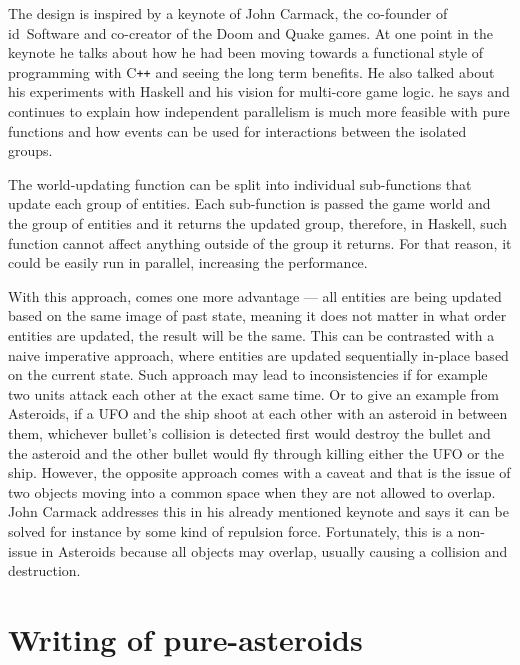 \documentclass[
  digital, %
  color,   %
  table,   %
  oneside, %
  lof,     %
  lot,     %
]{fithesis3}
\newcommand{\cpp}{C\nolinebreak\texttt{+}\nolinebreak\texttt{+}}
\begin{document}
The design is inspired by a keynote\cite{carmackkeynote} of John Carmack, the co-founder
of id~Software and co-creator of the Doom and Quake games.%
At one point in the keynote he talks about how he had been moving towards
a functional style of programming with \cpp{} and seeing the long term benefits.
He also talked about his experiments with Haskell and his vision for multi-core
game logic.  he says and
continues to explain how independent parallelism is much more feasible with pure
functions and how events can be used for interactions between the isolated groups.

The world-updating function can be split into individual sub-functions that update each group
of entities. Each sub-function is passed the game world and the group of entities and
it returns the updated group, therefore, in Haskell, such function cannot affect
anything outside of the group it returns. For that reason, it could be easily run
in parallel, increasing the performance.

With this approach, comes one more advantage
--- all entities are being updated based on the same image of past state, meaning
it does not matter in what order entities are updated, the result will be the same.
This can be contrasted with a naive imperative approach, where entities are
updated sequentially in-place based on the current state. Such approach may lead to
inconsistencies if for example two units attack each other at the exact same time.
Or to give an example from Asteroids, if a UFO and the ship shoot at each other
with an asteroid in between them, whichever bullet's collision is detected first
would destroy the bullet and the asteroid and the other bullet would fly through
killing either the UFO or the ship. However, the opposite approach comes with a caveat
and that is the issue of two objects moving into a common space when they are not allowed to overlap.
John Carmack addresses this in his already mentioned keynote\cite{carmackkeynote} and
says it can be solved for instance by some kind of repulsion force. Fortunately, this
is a non-issue in Asteroids because all objects may overlap, usually causing a collision
and destruction.



\section{Writing of pure-asteroids}
\label{sect:pureimplementation}
\end{document}
